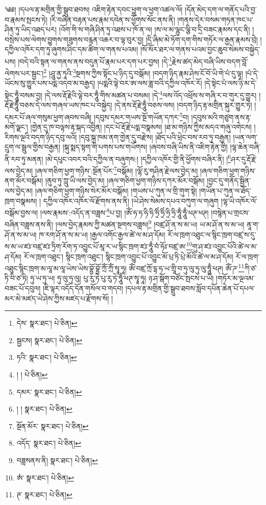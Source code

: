 \setcounter{footnote}{0} 
༄༅། །དཔལ་རྟ་མགྲིན་གྱི་སྒྲུབ་ཐབས། འཇིག་རྟེན་དབང་ཕྱུག་ལ་ཕྱག་འཚལ་ལོ། །དོན་མེད་དག་ལ་གནོད་པའི་བྱ་བ་རྣམས་སྤངས་ཏེ། །རི་བཞིན་བརྟན་པས་རྣམ་དབེན་ས་ཕྱོགས་སོང་ནས་ནི། །གནས་དེར་བསམ་གཏན་ཁང་པ་ཤིན་ཏུ་ཡིད་འཐད་པར། །འོག་གི་ས་གཞི་ཤིན་ཏུ་འཐས་པ་ཁོ་ན་ལ། །ས་ལ་མ་ལྷུང་ལྕི་བ་དྲི་བཟང་རྣམས་དང་ནི། །བསྲེས་པས་ལེགས་བྱུགས་གཟུགས་བརྙན་འཆར་བ་ལྟ་བུར་བྱ། །དྲི་ཞིམ་མེ་ཏོག་དག་གིས་གཏོར་ལ་རྒྱན་རྣམས་བྲེ། །དཀྱིལ་འཁོར་དག་ཏུ་ཞུགས་ཤིང་དམ་ཚིག་ལ་གནས་པའམ། །སོ་སོར་ཐར་ལ་གནས་པའམ་བྱང་ཆུབ་སེམས་བསྐྱེད་པས། །བདེ་བའི་སྟན་ལ་གནས་ནས་བདུན་པོ་རྣམ་པར་དག་པར་བྱས། །དེ་\footnote{དེས་  སྣར་ཐང་།  པེ་ཅིན། }རྗེས་ཚད་མེད་བཞི་ཡིས་བདག་བློ་ལེགས་པར་སྦྱང་།\footnote{སྦྱངས།  སྣར་ཐང་།  པེ་ཅིན། } །ཤཱུ་ནྱ་ཏཱའི་\footnote{ཏའི་  སྣར་ཐང་།  པེ་ཅིན། }སྔགས་ཀྱིས་སྟོང་པ་ཉིད་དུ་བསྒོམ། །བདག་ཉིད་རྣམ་ཤེས་ངོ་བོ་ཡི་གེ་པཾ་དུ་ལྟ། །པཾ་དེ་ཡོངས་སུ་གྱུར་པས་པདྨ་འདབ་མ་བརྒྱད། །པདྨའི་ལྟེ་བར་ཨ་ལས་ཟླ་བའི་དཀྱིལ་འཁོར་རོ། །དེ་སྟེང་པཾ་ལས་ཉི་མ་དེ་སྟེང་ཧཱུྃ་བསམ་བྱ། །དེ་ལས་རྡོ་རྗེའི་ལྟེ་བར་ཧཱུྃ་གིས་མཚན་པ་བསམ། །དེ་\footnote{། །  པེ་ཅིན། }ལས་འོད་འཕྲོས་ས་གཞི་ར་བ་གུར་དུ་གྱུར། །རྡོ་རྗེ་ཧཱུྃ་བཅས་དེ་ལས་གཞལ་ཡས་ཁང་པ་བསྐྱེད། །དེ་ནས་རྡོ་རྗེ་ཧཱུྃ་བཅས་ལས། །བདག་ཉིད་རྟ་མགྲིན་སྐུར་གྱུར་ཏེ། །དམར་པོ་ཞལ་གསུམ་ཕྱག་ཞབས་བཞི། །དབུས་དམར་གཡས་སྔོ་གཡོན་དཀར་\footnote{དམར་  སྣར་ཐང་།  པེ་ཅིན། }བ། །དབུས་མའི་གཙུག་ནས་རྟ་མགོ་ལྗང་། །གྱེན་དུ་ཁ་བལྟས་རྟ་སྐད་འབྱིན། །དང་པོ་རྡོ་རྗེ་པདྨ་བསྣམས། །ཐ་མ་གཉིས་ཀྱིས་མདའ་གཞུ་འགེངས། །རིགས་ལྔའི་བདག་ཉིད་དབུ་ལའོ། །དབུ་སྐྲ་ཁམ་ནག་གྱེན་དུ་བརྫེས། །ཐོད་པའི་ཕྲེང་བས་རབ་ཏུ་བརྒྱན། །ཡན་ལག་དྲུག་ལ་སྦྲུལ་གྱིས་བརྒྱན། །སྐུ་སྨད་སྟག་གི་པགས་པས་གཡོགས། །ཞབས་བཞི་ཡིས་ནི་འཇིག་རྟེན་གྱི། །ལྷ་ཆེན་བཞི་ནི་རབ་ཏུ་མནན། །མེ་དཔུང་འབར་བའི་དཀྱིལ་ན་བཞུགས:། །དཀྱིལ་འཁོར་གྱི་ནི་ཕྱོགས་བཞིར་ནི། །\footnote{། །  སྣར་ཐང་།  པེ་ཅིན། }ཤར་དུ་རྡོ་རྗེ་ལས་བྱེད་མ། །ཞལ་གཅིག་ཕྱག་གཉིས་:སྔོན་པོར་\footnote{སྔོན་མོར་  སྣར་ཐང་།  པེ་ཅིན། }བསྒོམ། །ལྷོ་རུ་གཤིན་རྗེ་ལས་བྱེད་མ། །ཞལ་གཅིག་ཕྱག་གཉིས་ནག་མོར་བསྒོམ། །ནུབ་ཏུ་ཀླུ་ཡི་ལས་བྱེད་མ། །ཞལ་གཅིག་ཕྱག་གཉིས་དཀར་མོར་བསྒོམ། །བྱང་དུ་གནོད་སྦྱིན་ལས་བྱེད་མ། །ཞལ་གཅིག་ཕྱག་གཉིས་སེར་མོར་བསྒོམ། །གཡས་པ་ཀུན་ལ་གྲི་གུག་སྟེ། །གཡོན་པ་ཀུན་ལ་ཐོད་ཁྲག་བསྣམས། །
དཀྱིལ་འཁོར་འཁོར་ལོ་རྫོགས་ནས་ནི། །ཡེ་ཤེས་སེམས་དཔའ་བཀུག་ལ་གཞུག །ལྷ་ཡི་འཁོར་ལོ་བསྒོམ་བྱས་ལ། །ལས་རྣམས་:འདོད་ན་བཟླས་\footnote{འདོད་  སྣར་ཐང་།  པེ་ཅིན། }པ་བྱ། །ཨོཾ་ཧ་ཧ་ཧི་ཧི་ཧྲིཾ་ཧྲིཾ་ཧྲི་ཧྲི་ཧཱུྃ་ཧཱུྃ་ཕཊ་ཕཊ། །བསྙེན་པ་གྲངས་བཞིན་བཟླས་ནས་ནི། །ལས་བྱེད་རྣམས་ཀྱི་མཚན་སྔགས་བཟླས།\footnote{བཟླསནས་ནི།  སྣར་ཐང་།  པེ་ཅིན། } །བཛྲ་ཤོ་ན་ས་མ་ཡ། ཡ་མ་ཤོ་ན་ས་མ་ཡ། ནཱ་ག་ཤོ་ན་ས་མ་ཡ། ཁ་རག་ཤོ་ན་ས་མ་ཡ། །རྒྱལ་འགོང་རྒྱལ་ཚེ་ལ་མ་ཤ་དོམ། རོ་ལ་ཁྲག་འཐུང་ལ་སྙིང་ཁྲག་བཛྲ་ས་དུ་ས་མ་ཡ་ཛཿ་བཛྲ་ཛཿ་ཏྲིག་རོག་ཏ་འབྱུང་པོ་མཱ་ར་ཡ་སྙིང་ཁྲག་ཛཿ་ཧཱུྃ་བཾ་ཧོཿ་བཛྲ་ཨ་\footnote{ཨཾ་  སྣར་ཐང་།  པེ་ཅིན། }གུ་ཤ་ཛཿ་འབྱུང་པོའི་ཚེ་ལ་མ་ཤ་དོམ། རོ་ལ་ཁྲག་འཐུང་། སྙིང་ཁྲག་འཐུང་། སྙིང་ཁྲག་འབྱུང་པོ་འབྱུང་མོ་པྲ་ཏི་པྲེ་མོའི་ཚེ་ལ་མ་ཤ་དོམ། རོ་ལ་ཁྲག་འཐུང་སྙིང་ཁྲག་མ་ལཱ་མ་ལཱ་ཡེས་ཡེས་བྷྱོ་བྷྱོ་ཀྲོཾ་ཀྲོཾ་སྭཱ་ཧཱ། ཨོཾ་བཛྲ་ཀྲོ་དྷ་ཧ་ཡ་གྲཱི་བ་ཧུ་ལུ་ཧུ་ལུ་ཧཱུྃ་ཕཊ། ཨོཾ་ཌ་\footnote{ཊ་  སྣར་ཐང་།  པེ་ཅིན། }ཀི་ཙ་ཏི་བི་ཙ་ཏི། ཧུ་ཡ་ཧུ་ཡ། ཧུ་ལུ་ཧུ་ལུ། པུ་རུ་ཏེ་པུ་རུ་ཏེ་ཧཱུྃ་ཕཊ་སྭཱ་ཧཱ། ཉ་ཤ་སྒོག་བཙོང་སྤངས་པ་ཡི། །གཏོར་མ་ལྔའམ་བཟང་པོ་དབུལ། །ཇི་ལྟར་འདོད་དོན་གསོལ་བ་གདབ། །དཔལ་རྟ་མགྲིན་གྱི་སྒྲུབ་ཐབས་སློབ་དཔོན་ཆེན་པོ་དཔལ་མར་མེ་མཛད་ཡེ་ཤེས་ཀྱིས་མཛད་པ་རྫོགས་སོ། ། 